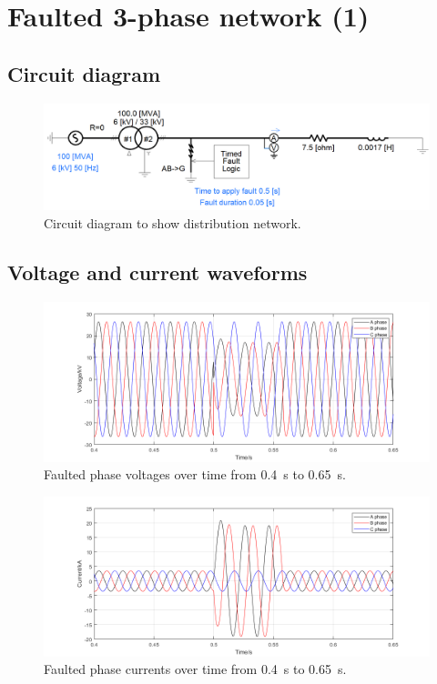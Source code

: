 \section{Faulted 3-phase network (1)}
\subsection{Circuit diagram}
\begin{figure}[H]
    \centering
    \includegraphics[width = \textwidth]{img/figure12.png}
    \caption{Circuit diagram to show distribution network.}
    \label{fig:distributionNetwork}
\end{figure}
\subsection{Voltage and current waveforms}
\begin{figure}[H]
    \centering
    \includegraphics[width = \textwidth]{img/figure14.png}
    \caption{Faulted phase voltages over time from \SI{0.4}{\second} to \SI{0.65}{\second}.}
    \label{fig:fault1}
\end{figure}
\begin{figure}[H]
    \centering
    \includegraphics[width = \textwidth]{img/figure13.png}
    \caption{Faulted phase currents over time from \SI{0.4}{\second} to \SI{0.65}{\second}.}
    \label{fig:fault2}
\end{figure}
